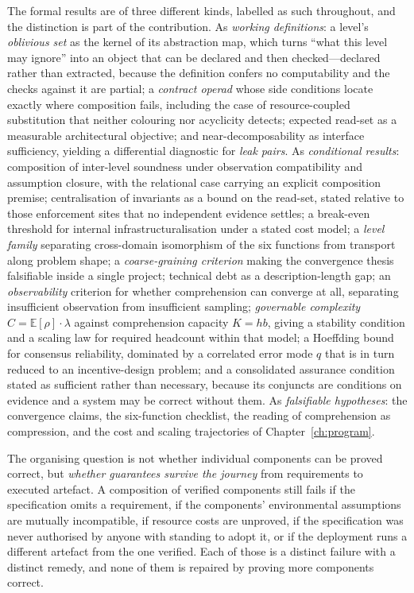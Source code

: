 \documentclass[11pt,a4paper,oneside,openany]{book}
\begin{document}
The formal results are of three different kinds, labelled as such throughout, and the
distinction is part of the contribution. As \emph{working definitions}: a level's
\emph{oblivious set} as the kernel of its abstraction map, which turns ``what this level may
ignore'' into an object that can be declared and then checked---declared rather than extracted,
because the definition confers no computability and the checks against it are partial; a
\emph{contract operad} whose side conditions locate exactly where composition fails, including
the case of resource-coupled substitution that neither colouring nor acyclicity detects; expected
read-set as a measurable architectural objective; and near-decomposability as interface
sufficiency, yielding a differential diagnostic for \emph{leak pairs}. As \emph{conditional
results}: composition of inter-level soundness under observation compatibility and assumption
closure, with the relational case carrying an explicit composition premise; centralisation of
invariants as a bound on the read-set, stated relative to those enforcement sites that no
independent evidence settles; a break-even threshold for internal infrastructuralisation under a
stated cost model; a \emph{level family} separating cross-domain isomorphism of the six functions
from transport along problem shape; a \emph{coarse-graining criterion} making the convergence
thesis falsifiable inside a single project; technical debt as a description-length gap; an
\emph{observability} criterion for whether comprehension can converge at all, separating
insufficient observation from insufficient sampling; \emph{governable complexity}
$C=\mathbb{E}[\rho]\cdot\lambda$ against comprehension capacity $K=hb$, giving a stability
condition and a scaling law for required headcount within that model; a Hoeffding bound for
consensus reliability, dominated by a correlated error mode $q$ that is in turn reduced to an
incentive-design problem; and a consolidated assurance condition stated as sufficient rather than
necessary, because its conjuncts are conditions on evidence and a system may be correct without
them. As \emph{falsifiable hypotheses}: the convergence claims, the six-function checklist, the
reading of comprehension as compression, and the cost and scaling trajectories of
Chapter~\ref{ch:program}.

The organising question is not whether individual components can be proved correct, but
\emph{whether guarantees survive the journey} from requirements to executed artefact. A
composition of verified components still fails if the specification omits a requirement, if the
components' environmental assumptions are mutually incompatible, if resource costs are unproved,
if the specification was never authorised by anyone with standing to adopt it, or if the
deployment runs a different artefact from the one verified. Each of those is a distinct failure
with a distinct remedy, and none of them is repaired by proving more components correct.
\end{document}
